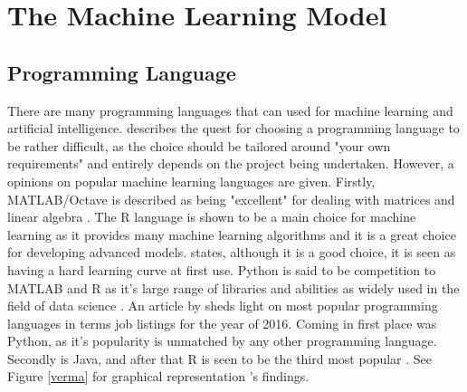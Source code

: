  	
 	


\section{The Machine Learning Model}


\subsection{Programming Language}
There are many programming languages that can used for machine learning and artificial intelligence. \citeauthor{brownlee} describes the quest for choosing a programming language to be rather difficult, as the choice should be tailored around "your own requirements" and entirely depends on the project being undertaken. However, a opinions on popular machine learning languages are given. Firstly, MATLAB/Octave is described as being "excellent" for dealing with matrices and linear algebra \citep{brownlee}. The R language is shown to be a main choice for machine learning as it provides many machine learning algorithms and it is a great choice for developing advanced models. \citeauthor{brownlee} states, although it is a good choice, it is seen as having a hard learning curve at first use. Python is said to be competition to MATLAB and R as it's large range of libraries and abilities as widely used in the field of data science \citep{brownlee}.
An article by \citeauthor{verma_2017} sheds light on most popular programming languages in terms job listings for the year of 2016. Coming in first place was Python, as it's popularity is unmatched by any other programming language. Secondly is Java, and after that R is seen to be the third most popular \citep{verma_2017}. See Figure \ref{verma} for graphical representation \citeauthor{verma_2017}'s findings.

